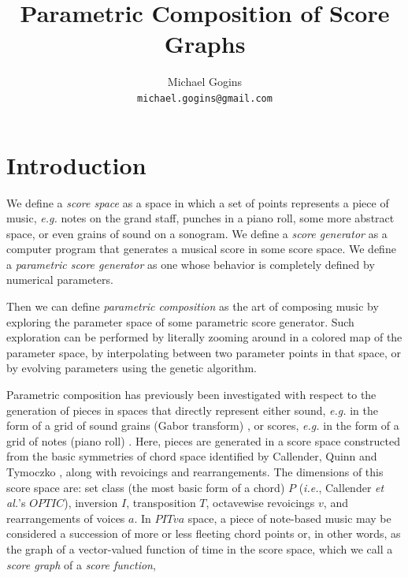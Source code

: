 \documentclass[english,11pt,letterpaper,onecolumn]{scrartcl}
\numberwithin{equation}{section}
\begin{document}
\title{Parametric Composition of Score Graphs}
\author{Michael Gogins \\ \texttt{michael.gogins@gmail.com}}
\maketitle


\section{Introduction}

We define a \textit{score space} as a space in which a set of points represents 
a piece of music, \textit{e.g.} notes on the grand staff, punches in a piano 
roll, some more abstract space, or even grains of sound on a sonogram. We 
define a \textit{score generator} as a computer program that generates a 
musical score in some score space. We define a \textit{parametric score 
generator} as one whose behavior is completely defined by numerical 
parameters. 

Then we can define \textit{parametric composition} as the art of composing 
music by exploring the parameter space of some parametric score generator. Such 
exploration can be performed by literally zooming around in a colored map of 
the parameter space, by interpolating between two parameter points in that 
space, or by evolving parameters using the genetic algorithm. 

Parametric composition has previously been investigated with respect to the 
generation of pieces in spaces that directly represent either sound, 
\textit{e.g.} in the form of a grid of sound grains (Gabor transform) 
\cite{obsessed}, or scores, \textit{e.g.} in the form of a grid of notes (piano 
roll) \cite{ifsmusic}. Here, pieces are generated in a score space constructed 
from the basic symmetries of chord space identified by Callender, Quinn and 
Tymoczko \cite{callender:346}, along with revoicings and rearrangements. The 
dimensions of this score space are: set class (the most basic form of a chord) 
$P$ (\textit{i.e.}, Callender \textit{et al.}'s $OPTIC$), inversion $I$, 
transposition $T$, octavewise revoicings $v$, and rearrangements of voices $a$. 
In $PITva$ space, a piece of note-based music may be considered a succession of 
more or less fleeting chord points or, in other words, as the graph of a 
vector-valued function of time in the score space, which we call a 
\textit{score graph} of a \textit{score function},
\end{document}

